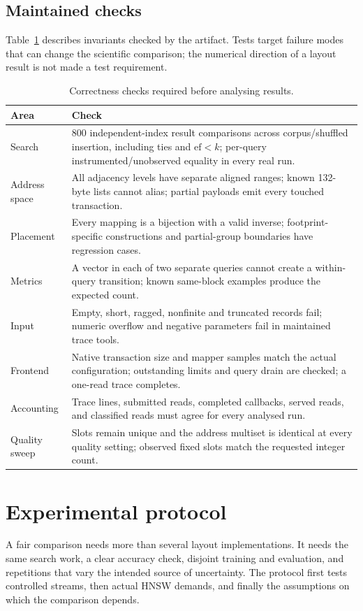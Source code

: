 \documentclass[11pt,a4paper]{report}
\begin{document}
\section{Maintained checks}
Table~\ref{tab:checks} describes invariants checked by the artifact. Tests target failure modes that can change the scientific comparison; the numerical direction of a layout result is not made a test requirement.
\begin{table}[htbp]\centering\small
\caption[Correctness checks]{Correctness checks required before analysing results.}\label{tab:checks}
\begin{tabular}{p{}p{}}\toprule
Area & Check\\\midrule
Search & 800 independent-index result comparisons across corpus/shuffled insertion, including ties and $\mathrm{ef}<k$; per-query instrumented/unobserved equality in every real run.\\
Address space & All adjacency levels have separate aligned ranges; known 132-byte lists cannot alias; partial payloads emit every touched transaction.\\
Placement & Every mapping is a bijection with a valid inverse; footprint-specific constructions and partial-group boundaries have regression cases.\\
Metrics & A vector in each of two separate queries cannot create a within-query transition; known same-block examples produce the expected count.\\
Input & Empty, short, ragged, nonfinite and truncated records fail; numeric overflow and negative parameters fail in maintained trace tools.\\
Frontend & Native transaction size and mapper samples match the actual configuration; outstanding limits and query drain are checked; a one-read trace completes.\\
Accounting & Trace lines, submitted reads, completed callbacks, served reads, and classified reads must agree for every analysed run.\\
Quality sweep & Slots remain unique and the address multiset is identical at every quality setting; observed fixed slots match the requested integer count.\\\bottomrule
\end{tabular}
\end{table}

\chapter{Experimental protocol}
A fair comparison needs more than several layout implementations. It needs the same search work, a clear accuracy check, disjoint training and evaluation, and repetitions that vary the intended source of uncertainty. The protocol first tests controlled streams, then actual HNSW demands, and finally the assumptions on which the comparison depends.
\end{document}
